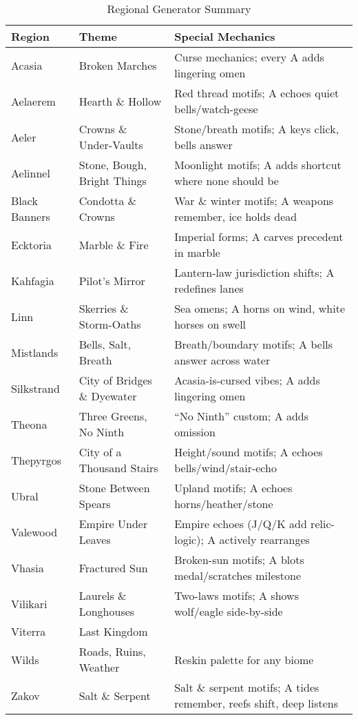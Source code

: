 \begin{table}[htbp]
\centering
\begin{tabular}{lll}
\toprule
\textbf{Region} & \textbf{Theme} & \textbf{Special Mechanics} \\
\midrule
Acasia & Broken Marches & Curse mechanics; every A adds lingering omen \\
Aelaerem & Hearth \& Hollow & Red thread motifs; A echoes quiet bells/watch-geese \\
Aeler & Crowns \& Under-Vaults & Stone/breath motifs; A keys click, bells answer \\
Aelinnel & Stone, Bough, Bright Things & Moonlight motifs; A adds shortcut where none should be \\
Black Banners & Condotta \& Crowns & War \& winter motifs; A weapons remember, ice holds dead \\
Ecktoria & Marble \& Fire & Imperial forms; A carves precedent in marble \\
Kahfagia & Pilot's Mirror & Lantern-law jurisdiction shifts; A redefines lanes \\
Linn & Skerries \& Storm-Oaths & Sea omens; A horns on wind, white horses on swell \\
Mistlands & Bells, Salt, Breath & Breath/boundary motifs; A bells answer across water \\
Silkstrand & City of Bridges \& Dyewater & Acasia-is-cursed vibes; A adds lingering omen \\
Theona & Three Greens, No Ninth & ``No Ninth'' custom; A adds omission \\
Thepyrgos & City of a Thousand Stairs & Height/sound motifs; A echoes bells/wind/stair-echo \\
Ubral & Stone Between Spears & Upland motifs; A echoes horns/heather/stone \\
Valewood & Empire Under Leaves & Empire echoes (J/Q/K add relic-logic); A actively rearranges \\
Vhasia & Fractured Sun & Broken-sun motifs; A blots medal/scratches milestone \\
Vilikari & Laurels \& Longhouses & Two-laws motifs; A shows wolf/eagle side-by-side \\
Viterra & Last Kingdom & & \\
Wilds & Roads, Ruins, Weather & Reskin palette for any biome \\
Zakov & Salt \& Serpent & Salt \& serpent motifs; A tides remember, reefs shift, deep listens \\
\bottomrule
\end{tabular}
\caption{Regional Generator Summary}
\end{table}

